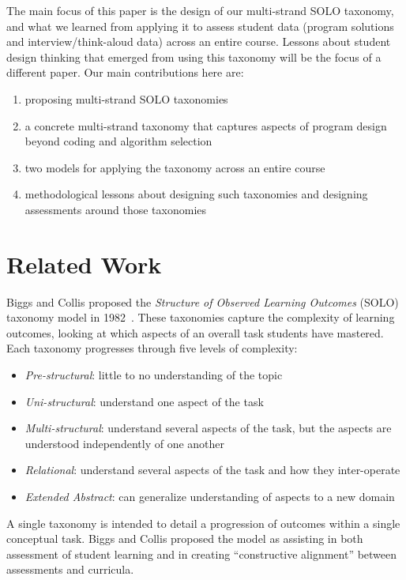 The main focus of this paper is the design of our multi-strand SOLO
taxonomy, and what we learned from applying it to assess student data
(program solutions and interview/think-aloud data) across an entire course.  Lessons about student design thinking that emerged from using this taxonomy
will be the focus of a different paper. Our main contributions here
are:
\begin{enumerate}
  \item proposing multi-strand SOLO taxonomies
  \item a concrete multi-strand taxonomy that captures aspects of program design beyond coding and algorithm selection
  \item two models for applying the taxonomy across an entire course
  \item methodological lessons about designing such taxonomies and designing
    assessments around those taxonomies
\end{enumerate}

\section{Related Work}

Biggs and Collis proposed the \emph{Structure of Observed Learning Outcomes}
(SOLO) taxonomy model in 1982~\cite{biggs-collis-solo82}.
These taxonomies capture the complexity of learning outcomes, looking
at which aspects of an overall task students have mastered.  Each
taxonomy progresses through five levels of complexity:
\begin{itemize}
\item \emph{Pre-structural}: little to no understanding of the topic
\item \emph{Uni-structural}: understand one aspect of the task
\item \emph{Multi-structural}: understand several aspects of the task,
  but the aspects are understood independently of one another
\item \emph{Relational}: understand several aspects of the task and
  how they inter-operate
\item \emph{Extended Abstract}: can generalize understanding of
  aspects to a new domain
\end{itemize}
\noindent A single taxonomy is intended to detail a progression of
outcomes within a single conceptual task.  Biggs and Collis proposed
the model as assisting in both assessment of student learning and in
creating ``constructive alignment'' between assessments and curricula.

